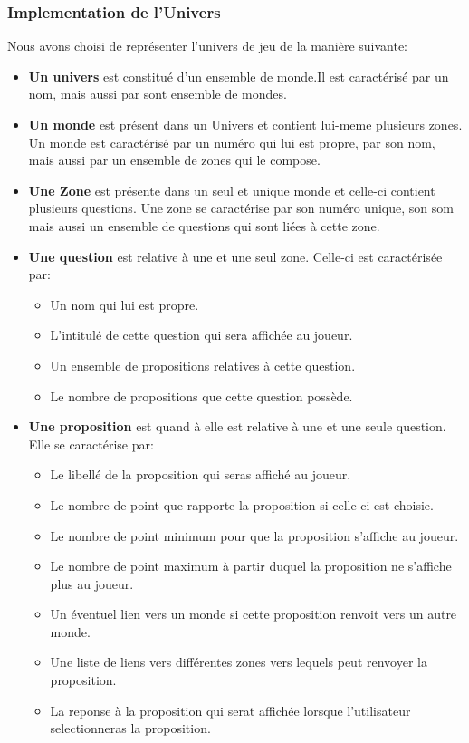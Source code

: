 \subsubsection{Implementation de l'Univers}
Nous avons choisi de représenter l'univers de jeu de la manière suivante:
\begin{itemize}
\item \textbf{Un univers} est constitué d'un ensemble de monde.Il est caractérisé par un nom, mais aussi par sont ensemble de mondes.
\item \textbf{Un monde} est présent dans un Univers et contient lui-meme plusieurs zones. Un monde est caractérisé par un numéro qui lui est propre, par son nom, mais aussi par un ensemble de zones qui le compose. 
\item \textbf{Une Zone} est présente dans un seul et unique monde et celle-ci contient plusieurs questions. Une zone se caractérise par son numéro unique, son som mais aussi un ensemble de questions qui sont liées à cette zone.
\item \textbf{Une question} est relative à une et une seul zone. Celle-ci est caractérisée par: \begin{itemize}
					\item Un nom qui lui est propre.
					\item L'intitulé de cette question qui sera affichée au joueur.
					\item Un ensemble de propositions relatives à cette question.
					\item Le nombre de propositions que cette question possède.
				  \end{itemize} 
\item \textbf{Une proposition} est quand à elle est relative à une et une seule question.
Elle se caractérise par:\begin{itemize}
							\item Le libellé de la proposition qui seras affiché au 									  joueur.
							\item Le nombre de point que rapporte la proposition si 		   							  celle-ci est choisie.
							\item Le nombre de point minimum pour que la proposition 		   							  s'affiche au joueur.
							\item Le nombre de point maximum à partir duquel la 		                                  proposition ne s'affiche plus au joueur.
							\item Un éventuel lien vers un monde si cette proposition 									  renvoit vers un autre monde. 
							\item Une liste de liens vers différentes zones vers 			   							  lequels peut renvoyer la proposition.
							\item La reponse à la proposition qui serat affichée 	  									  lorsque l'utilisateur selectionneras la proposition.   
					    \end{itemize}
					    
\end{itemize}
